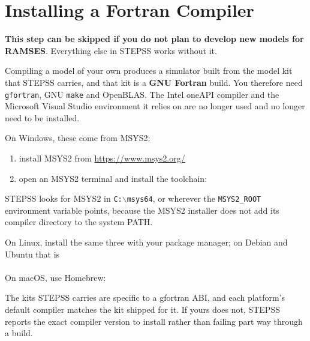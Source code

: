 \section{Installing a Fortran Compiler}

{\bf \large This step can be skipped if you do not plan to develop new models for RAMSES}. Everything else in STEPSS works without it.

Compiling a model of your own produces a simulator built from the model kit that STEPSS carries, and that kit is a {\bf GNU Fortran} build. You therefore need {\tt gfortran}, GNU {\tt make} and OpenBLAS. The Intel oneAPI compiler and the Microsoft Visual Studio environment it relies on are no longer used and no longer need to be installed.

On Windows, these come from MSYS2:
\begin{enumerate}
\item install MSYS2 from \url{https://www.msys2.org/}
\item open an MSYS2 terminal and install the toolchain:\\
\hspace*{5ex}{\tt pacman -S mingw-w64-x86\_64-gcc-fortran mingw-w64-x86\_64-openblas make}
\end{enumerate}

STEPSS looks for MSYS2 in {\tt C:$\backslash$msys64}, or wherever the {\tt MSYS2\_ROOT} environment variable points, because the MSYS2 installer does not add its compiler directory to the system PATH.

On Linux, install the same three with your package manager; on Debian and Ubuntu that is\\
\hspace*{5ex}{\tt sudo apt install gfortran make libopenblas-dev}\\
On macOS, use Homebrew:\\
\hspace*{5ex}{\tt brew install gcc openblas}

The kits STEPSS carries are specific to a gfortran ABI, and each platform's default compiler matches the kit shipped for it. If yours does not, STEPSS reports the exact compiler version to install rather than failing part way through a build.
